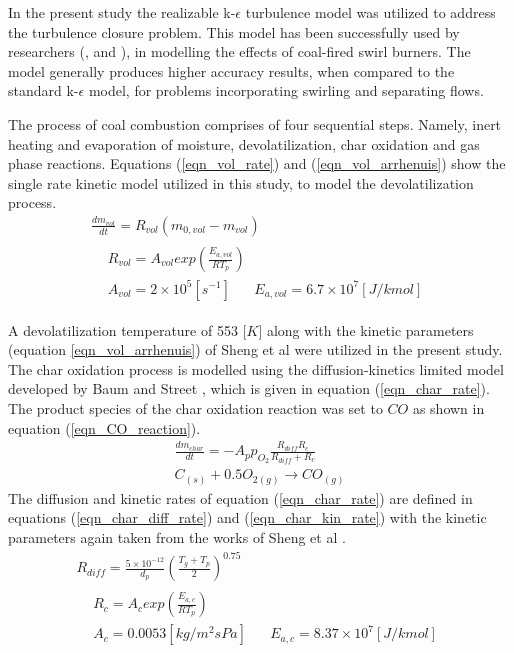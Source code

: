 \documentclass[review]{elsarticle}
\begin{document}
In the present study the realizable k-$\epsilon$ turbulence model was utilized to address the turbulence closure problem. This model has been successfully used by researchers (\cite{Belosevic2019a},\cite{Laubscher2019a} and \cite{Modlinski2019}), in modelling the effects of coal-fired swirl burners. The model generally produces higher accuracy results, when compared to the standard k-$\epsilon$ model, for problems incorporating swirling and separating flows.

The process of coal combustion comprises of four sequential steps. Namely, inert heating and evaporation of moisture, devolatilization, char oxidation and gas phase reactions. Equations (\ref{eqn_vol_rate}) and (\ref{eqn_vol_arrhenuis}) show the single rate kinetic model utilized in this study, to model the devolatilization process.
\begin{gather}
\frac{dm_{vol}}{dt} = R_{vol}(m_{0,vol}-m_{vol}) \label{eqn_vol_rate} \\
\begin{split}
&R_{vol} = A_{vol}exp\left(\frac{E_{a,vol}}{RT_p}\right)\\
&A_{vol} = 2\times10^5 [s^{-1}]\,\,\,\,\,\,\,\,\,\,E_{a,vol} = 6.7\times10^7 [J/kmol] \label{eqn_vol_arrhenuis}
\end{split}
\end{gather}

A devolatilization temperature of 553 [$K$] \citep{Ranade2015} along with the kinetic parameters (equation \ref{eqn_vol_arrhenuis}) of Sheng et al \cite{Sheng2004} were utilized in the present study. The char oxidation process is modelled using the diffusion-kinetics limited model developed by Baum and Street \cite{Baum1971}, which is given in equation (\ref{eqn_char_rate}). The product species of the char oxidation reaction was set to $CO$ as shown in equation (\ref{eqn_CO_reaction}). 
\begin{gather}
\frac{dm_{char}}{dt} = -A_p p_{O_{2}} \frac{R_{diff}R_c}{R_{diff} + R_c}  \label{eqn_char_rate}\\
C_{(s)}+0.5O_{2(g)}\to CO_{(g)} \label{eqn_CO_reaction}
\end{gather}
The diffusion and kinetic rates of equation (\ref{eqn_char_rate}) are defined in equations (\ref{eqn_char_diff_rate})  and (\ref{eqn_char_kin_rate}) with the kinetic parameters again taken from the works of Sheng et al \citep{Sheng2004}.
\begin{gather}
R_{diff} = \frac{5\times10^{-12}}{d_p} \left(\frac{T_g+T_p}{2}\right)^{0.75} \label{eqn_char_diff_rate}\\
\begin{split}
&R_{c} = A_{c}exp\left(\frac{E_{a,c}}{RT_p}\right)\\
&A_{c} = 0.0053 [kg/m^2sPa]\,\,\,\,\,\,\,\,\,\,E_{a,c} = 8.37\times10^7 [J/kmol]
\end{split}
 \label{eqn_char_kin_rate}
\end{gather}
\end{document}
